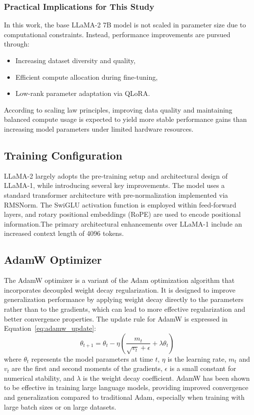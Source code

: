 \subsubsection{Practical Implications for This Study}

In this work, the base LLaMA-2 7B model is not scaled in parameter size due to computational constraints. Instead, performance improvements are pursued through:
\begin{itemize}
    \item Increasing dataset diversity and quality,
    \item Efficient compute allocation during fine-tuning,
    \item Low-rank parameter adaptation via QLoRA.
\end{itemize}

According to scaling law principles, improving data quality and maintaining balanced compute usage is expected to yield more stable performance gains than increasing model parameters under limited hardware resources.

\subsection{Training Configuration}
LLaMA-2 largely adopts the pre-training setup and architectural design of LLaMA-1,
while introducing several key improvements. The model
uses a standard transformer architecture with
pre-normalization implemented via RMSNorm. The SwiGLU
activation function is employed within feed-forward layers,
and rotary positional embeddings (RoPE) are used to encode
positional information.The primary architectural enhancements over LLaMA-1 include an increased context
length of 4096 tokens.

\subsection{AdamW Optimizer}
The AdamW optimizer is a variant of the Adam optimization algorithm that incorporates decoupled weight decay regularization. It is designed to improve generalization performance by applying weight decay directly to the parameters rather than to the gradients, which can lead to more effective regularization and better convergence properties. The update rule for AdamW is expressed in Equation~\eqref{eq:adamw_update}:
\begin{equation}
    \label{eq:adamw_update}
    \theta_{t+1} = \theta_t - \eta \left( \frac{m_t}{\sqrt{v_t} + \epsilon} + \lambda \theta_t \right)
\end{equation}
where $\theta_t$ represents the model parameters at time $t$, $\eta$ is the learning rate, $m_t$ and $v_t$ are the first and second moments of the gradients, $\epsilon$ is a small constant for numerical stability, and $\lambda$ is the weight decay coefficient. AdamW has been shown to be effective in training large language models, providing improved convergence and generalization compared to traditional Adam, especially when training with large batch sizes or on large datasets.

